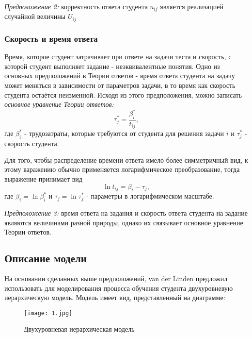 {\itshape Предположение 2:} корректность ответа студента $u_{ij}$ является реализацией случайной величины $U_{ij}$

\subsubsection{Скорость и время ответа}

Время, которое студент затрачивает при ответе на задачи теста и  скорость, с которой студент выполняет задание - неэквивалентные понятия. Одно из основных предположений в  Теории ответов - время ответа студента на задачу может меняться в зависимости от параметров задачи, в то время как скорость студента остаётся неизменной. Исходя из этого предположения, можно записать {\itshape основное уравнение Теории ответов:}
\begin{equation}
\tau_{j}^{*} = \frac{\beta^{*}_{i}}{t_{ij}},
\end{equation}
где $\beta^{*}_{i}$ - трудозатраты, которые требуются от студента для решения задачи $i$ и $\tau_{j}^{*}$ - скорость студента.

Для того, чтобы распределение времени ответа имело более симметричный вид, к этому варажению обычно применяется логарифмическое преобразование, тогда выражение при\-нимает вид
\begin{equation}
\ln {t_{ij}} = \beta_{i} - \tau_{j},
\end{equation}
где $\beta_{i} = \ln \beta^{*}_{i}$ и $\tau_{j} = \ln \tau^{*}_{j}$ - параметры в логарифмическом масштабе.

{\itshape Предположение 3:} время ответа на задания и скорость ответа студента на задание являются величинами разной природы, однако их связывает основное уравнение Теории ответов.

\newpage
\subsection{Описание модели}

\label{detmodel} 

На основании сделанных выше предположений, van der Linden предложил использовать для моделирования процесса обучения студента двухуровневую иерархическую модель. Модель имеет вид, представленный на диаграмме:

\begin{figure}[ht!] 
\centering \texttt{[image: 1.jpg]} 
\caption{Двухуровневая иерархическая модель} 
\end{figure}

